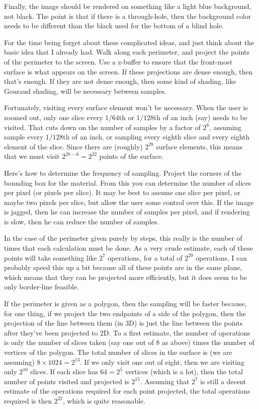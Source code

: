\documentclass[titlepage,oneside,10pt]{article}
\begin{document}
Finally, the image should be rendered on something like a light blue
background, not black. The point is that if there is a through-hole,
then the background color needs to be different than the black used
for the bottom of a blind hole.

For the time being forget about these complicated ideas, and just
think about the basic idea that I already had. Walk along each
perimeter, and project the points of the perimeter to the screen. Use
a z-buffer to ensure that the front-most surface is what appears on
the screen. If these projections are dense enough, then that's
enough. If they are not dense enough, then some kind of shading, like
Gouraud shading, will be necessary between samples.

Fortunately, visiting every surface element won't be necessary. When
the user is zoomed out, only one slice every $1/64$th or $1/128$th of
an inch (say) needs to be visited. That cuts down on the number of
samples by a factor of $2^6$, assuming sample every $1/128$th of an
inch, or sampling every eighth slice and every eighth element of the
slice. Since there are (roughly) $2^{28}$ surface elements, this means
that we must visit $2^{28-6} = 2^{22}$ points of the surface.

Here's how to determine the frequency of sampling. Project the corners
of the bounding box for the material. From this you can determine the
number of slices per pixel (or pixels per slice). It may be best to
assume one slice per pixel, or maybe two pixels per slice, but allow
the user some control over this. If the image is jagged, then he can
increase the number of samples per pixel, and if rendering is slow,
then he can reduce the number of samples.

In the case of the perimeter given purely by steps, this really is the
number of times that each calculation must be done. As a very crude
estimate, each of these points will take something like $2^7$
operations, for a total of $2^{29}$ operations. I can probably speed
this up a bit because all of these points are in the same plane, which
means that they can be projected more efficiently, but it does seem to
be only border-line feasible.

If the perimeter is given as a polygon, then the sampling will be
faster because, for one thing, if we project the two endpoints of a
side of the polygon, then the projection of the line between them (in
3D) is just the line between the points after they've been projected
to 2D. To a first estimate, the number of operations is only the
number of slices taken (say one out of 8 as above) times the number of
vertices of the polygon. The total number of slices in the surface is
(we are assuming) $8\times 1024=2^{13}$. If we only visit one out of
eight, then we are visiting only $2^{10}$ slices. If each slice has
$64=2^5$ vertices (which is a lot), then the total number of points
visited and projected is $2^{15}$. Assuming that $2^7$ is still a
decent estimate of the operations required for each point projected,
the total operations required is then $2^{22}$, which is quite reasonable.
\end{document}
